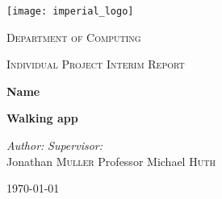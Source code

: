 \begin{titlepage}
    \begin{center}
        \vspace*{2cm}
        \texttt{[image: imperial\_logo]}
        \vspace{2cm}
        
        \LARGE
        \textsc{Department of Computing}
        
        \textsc{Individual Project Interim Report}
        
        \vspace{2cm}
        \vhrulefill{2pt}
        \vspace{0.2cm}
        
        \huge
        \textbf{Name}
        
        \vspace{0.2cm}
        
        \LARGE
        \textbf{Walking app}
        
        \vspace{0.2cm}
        \vhrulefill{2pt}
        \vspace{2cm}
        
        \begin{flushleft}
            \Large
            \textit{Author:}
            \hfill
            \textit{Supervisor:}\\
            Jonathan \textsc{Muller}
            \hfill
            Professor Michael \textsc{Huth}\\
        \end{flushleft}
        
        \vfill
        \Large
        \today
    \end{center}
\end{titlepage}